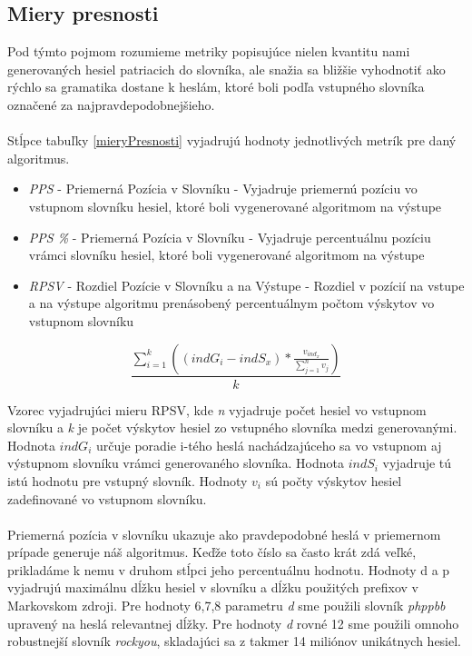 \subsection{Miery presnosti}
Pod týmto pojmom rozumieme metriky popisujúce nielen kvantitu nami generovaných hesiel patriacich do slovníka, ale snažia sa bližšie vyhodnotiť ako rýchlo sa gramatika dostane k heslám, ktoré boli podľa vstupného slovníka označené za najpravdepodobnejšieho.

\paragraph{}
Stĺpce tabuľky \ref{mieryPresnosti} vyjadrujú hodnoty jednotlivých metrík pre daný algoritmus.
\begin{itemize}
	\item \emph{PPS} - Priemerná Pozícia v Slovníku - Vyjadruje priemernú pozíciu vo vstupnom slovníku hesiel, ktoré boli vygenerované algoritmom na výstupe
	\item \emph{PPS \%} - Priemerná Pozícia v Slovníku - Vyjadruje percentuálnu pozíciu vrámci slovníku hesiel, ktoré boli vygenerované algoritmom na výstupe
	\item \emph{RPSV} - Rozdiel Pozície v Slovníku a na Výstupe - Rozdiel v pozícií na vstupe a na výstupe algoritmu prenásobený percentuálnym počtom výskytov vo vstupnom slovníku
\end{itemize}

\[ \frac{\displaystyle\sum_{i=1}^{k}((indG_i - indS_x) * \frac{v_{ind_x}}{\sum_{j=1}^{n}v_j})}{k} \]

Vzorec vyjadrujúci mieru RPSV, kde \emph{n} vyjadruje počet hesiel vo vstupnom slovníku a \emph{k} je počet výskytov hesiel zo vstupného slovníka medzi generovanými. Hodnota \emph{\(indG_i\)} určuje poradie i-tého heslá nachádzajúceho sa vo vstupnom aj výstupnom slovníku vrámci generovaného slovníka. Hodnota \emph{\(indS_i\)} vyjadruje tú istú hodnotu pre vstupný slovník. Hodnoty \emph{\(v_i\)} sú počty výskytov hesiel zadefinované vo vstupnom slovníku.

\paragraph{}
Priemerná pozícia v slovníku ukazuje ako pravdepodobné heslá v priemernom prípade generuje náš algoritmus. Keďže toto číslo sa často krát zdá veľké, prikladáme k nemu v druhom stĺpci jeho percentuálnu hodnotu. Hodnoty d a p vyjadrujú maximálnu dĺžku hesiel v slovníku a dĺžku použitých prefixov v Markovskom zdroji. Pre hodnoty 6,7,8 parametru \emph{d} sme použili slovník \emph{phppbb} upravený na heslá relevantnej dĺžky. Pre hodnoty \emph{d} rovné 12 sme použili omnoho robustnejší slovník \emph{rockyou}, skladajúci sa z takmer 14 miliónov unikátnych hesiel.

